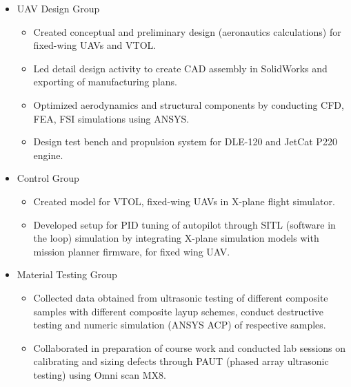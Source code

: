 \documentclass[margin, 10pt]{res} %
\begin{document}
\begin{resume}
\begin{itemize}
\item UAV Design Group

   \begin{itemize}
    \item Created conceptual and preliminary design (aeronautics calculations) for fixed-wing UAVs and VTOL. 
    \item Led detail design activity to create CAD assembly in SolidWorks and exporting of manufacturing plans.
    \item Optimized aerodynamics and structural components by conducting CFD, FEA, FSI simulations using ANSYS. %
    \item Design test bench and propulsion system for DLE-120 and JetCat P220  engine.%
    \end{itemize}

\item Control Group

    \begin{itemize}
    \item Created model for VTOL, fixed-wing UAVs in X-plane flight simulator.
    \item Developed setup for PID tuning of autopilot through SITL (software in the loop) simulation by integrating X-plane simulation models with mission planner firmware, for fixed wing UAV.
    \end{itemize} 
    


\item Material Testing Group

    \begin{itemize}
    \item Collected data obtained from ultrasonic testing of different composite samples with different composite layup schemes, conduct destructive testing  and numeric simulation (ANSYS ACP) of respective samples.
    \item Collaborated in preparation of course work and conducted lab sessions on calibrating and sizing defects through PAUT (phased array ultrasonic testing) using Omni scan MX8. 
    \end{itemize} 
    
\end{itemize} 



\end{resume}
\end{document}
